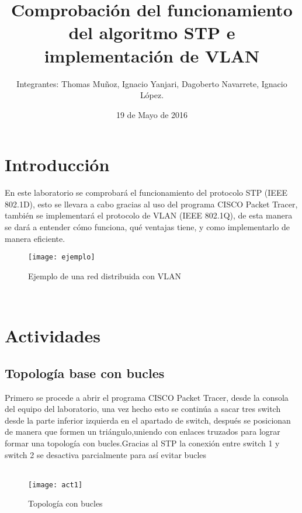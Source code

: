 \documentclass{udpreport}
\title{Comprobación del funcionamiento del algoritmo STP e implementación de VLAN}
\author{Integrantes: Thomas Muñoz, Ignacio Yanjari, Dagoberto Navarrete, Ignacio López.}
\date{19 de Mayo de 2016}
\begin{document}
\maketitle
\tableofcontents
\listoffigures
\chapter{Introducción}
  En este laboratorio se comprobará el funcionamiento del protocolo STP (IEEE 802.1D),  esto se llevara a cabo gracias al uso del programa CISCO Packet Tracer, también se implementará el protocolo de  VLAN (IEEE 802.1Q), de esta manera se dará a entender cómo funciona, qué  ventajas tiene, y como implementarlo de manera eficiente.
  	\begin{figure}[H]
	\centering
	\texttt{[image: ejemplo]}
	\caption{Ejemplo de una red distribuida con VLAN}
	\end{figure}\\	
  \vfill
  
\chapter{Actividades}
	\section{Topología base con bucles}
	Primero se procede a abrir el programa CISCO Packet Tracer, desde la consola del equipo del laboratorio, una vez hecho esto se
	continúa a sacar tres switch desde la parte inferior izquierda en el apartado de switch, después se posicionan de manera que
	formen un triángulo,uniendo con enlaces truzados para lograr formar una topología con bucles.Gracias al STP la conexión entre switch 1 y switch 2 se desactiva parcialmente para así evitar bucles \\\\
	\begin{figure}[H]
    \centering
    \texttt{[image: act1]}
    \caption{Topología con bucles}
    \end{figure}
    
\end{document}
